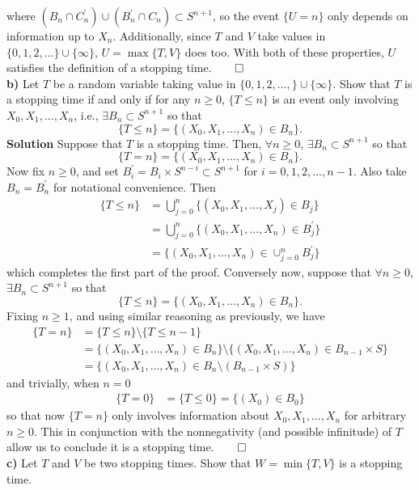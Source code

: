 \documentclass[11pt, letterpaper]{article}
\begin{document}
    where $(B_n\cap C_n^\prime)\cup(B_n^\prime\cap C_n)\subset S^{n+1}$, so the event $\{U=n\}$ only depends on information up to $X_n$. Additionally, since $T$ and $V$ take values in $\{0,1,2,\dots\}\cup\{\infty\}$, $U=\max\{T,V\}$ does too. With both
    of these properties, $U$ satisfies the definition of a stopping time.\hfill{$\qed$}\\[10pt]
    {\bf b)} Let $T$ be a random variable taking value in $\{0,1,2,\dots,\}\cup\{\infty\}$. Show that $T$ is a stopping time if and only if for any $n\geq 0$, $\{T\leq n\}$ is an event only involving $X_0,X_1,\dots,X_n$, i.e., $\exists B_n\subset S^{n+1}$ so that
    \[\{T\leq n\}=\{(X_0,X_1,\dots,X_n)\in B_n\}.\]
    {\bf Solution} Suppose that $T$ is a stopping time. Then, $\forall n\geq 0$, $\exists B_n\subset S^{n+1}$ so that
    \[\{T= n\}=\{(X_0,X_1,\dots,X_n)\in B_n\}.\]
    Now fix $n\geq 0$, and set $B_i^\prime=B_i\times S^{n-i}\subset S^{n+1}$ for $i=0,1,2,\dots,n-1$. Also take $B_n=B_n^\prime$ for notational convenience. Then
    \begin{align*}
        \{T\leq n\}&=\bigcup_{j=0}^n\{(X_0,X_1,\dots,X_j)\in B_j\}\\
        &=\bigcup_{j=0}^n\{(X_0,X_1,\dots,X_n)\in B_j^\prime\}\\
        &=\{(X_0,X_1,\dots,X_n)\in\cup_{j=0}^n B_j^\prime\}
    \end{align*}
    which completes the first part of the proof. Conversely now, suppose that $\forall n\geq 0$, $\exists B_n\subset S^{n+1}$ so that
    \[\{T\leq n\}=\{(X_0,X_1,\dots,X_n)\in B_n\}.\]
    Fixing $n\geq 1$, and using similar reasoning as previously, we have
    \begin{align*}
        \{T=n\}&=\{T\leq n\}\setminus\{T\leq n-1\}\\
        &=\{(X_0,X_1,\dots,X_n)\in B_n\}\setminus\{(X_0,X_1,\dots,X_n)\in B_{n-1}\times S\}\\
        &=\{(X_0,X_1,\dots,X_n)\in B_n\setminus (B_{n-1}\times S)\}
    \end{align*}
    and trivially, when $n=0$
    \begin{align*}
        \{T=0\}&=\{T\leq 0\}=\{(X_0)\in B_0\}
    \end{align*}
    so that now $\{T=n\}$ only involves information about $X_0,X_1,\dots,X_n$ for arbitrary $n\geq 0$. This in conjunction with the nonnegativity (and possible infinitude) of $T$ allow us to conclude it is a stopping time.\hfill{$\qed$}\\[10pt]
    {\bf c)} Let $T$ and $V$ be two stopping times. Show that $W=\min\{T,V\}$ is a stopping time.\\[10pt]
\end{document}
